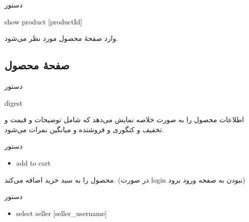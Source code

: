 \documentclass[]{article}
\begin{document}
\begin{mybox}[colback=yellow]{دستور}

\begin{latin}

show product [productId]

\end{latin}

\end{mybox}

وارد صفحهٔ محصول مورد نظر می‌شود.

\subsection*{{\titr صفحهٔ محصول}}



\begin{mybox}[colback=yellow]{دستور}

\begin{latin}

digest

\end{latin}

\end{mybox}

اطلاعات محصول را به صورت خلاصه نمایش می‌دهد که شامل توضیحات و قیمت و تخفیف و کتگوری و فروشنده و میانگین نمرات می‌شود.


\begin{mybox}[colback=brilliantlavender]{دستور}

\begin{latin}

\begin{itemize}[label = {$\Rightarrow$}]

\item
add to cart

\end{itemize}

\end{latin}

\end{mybox}

محصول را به سبد خرید اضافه می‌کند. (در صورت login نبودن به صفحه ورود برود)


\begin{mybox}[colback=brilliantlavender]{دستور}

\begin{latin}

\begin{itemize}[label = {$\Rightarrow$}]

\item
select seller [seller\_username]

\end{itemize}

\end{latin}

\end{mybox}
\end{document}
